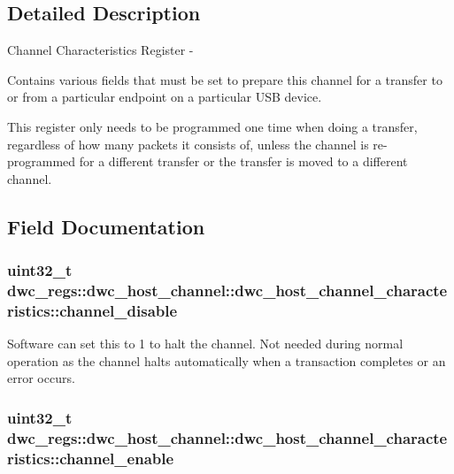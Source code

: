 \subsection{Detailed Description}
Channel Characteristics Register -\/

Contains various fields that must be set to prepare this channel for a transfer to or from a particular endpoint on a particular U\-S\-B device.

This register only needs to be programmed one time when doing a transfer, regardless of how many packets it consists of, unless the channel is re-\/programmed for a different transfer or the transfer is moved to a different channel. 

\subsection{Field Documentation}
\hypertarget{uniondwc__regs_1_1dwc__host__channel_1_1dwc__host__channel__characteristics_a4e988854338720d604bc23d118da2c2f}{
\subsubsection[{channel\-\_\-disable}]{\setlength{\rightskip}{0pt plus 5cm}uint32\-\_\-t dwc\-\_\-regs\-::dwc\-\_\-host\-\_\-channel\-::dwc\-\_\-host\-\_\-channel\-\_\-characteristics\-::channel\-\_\-disable}}\label{uniondwc__regs_1_1dwc__host__channel_1_1dwc__host__channel__characteristics_a4e988854338720d604bc23d118da2c2f}
Software can set this to 1 to halt the channel. Not needed during normal operation as the channel halts automatically when a transaction completes or an error occurs. \hypertarget{uniondwc__regs_1_1dwc__host__channel_1_1dwc__host__channel__characteristics_ae91ab39a4ea7d70775720382d1550b0a}{
\subsubsection[{channel\-\_\-enable}]{\setlength{\rightskip}{0pt plus 5cm}uint32\-\_\-t dwc\-\_\-regs\-::dwc\-\_\-host\-\_\-channel\-::dwc\-\_\-host\-\_\-channel\-\_\-characteristics\-::channel\-\_\-enable}}\label{uniondwc__regs_1_1dwc__host__channel_1_1dwc__host__channel__characteristics_ae91ab39a4ea7d70775720382d1550b0a}
